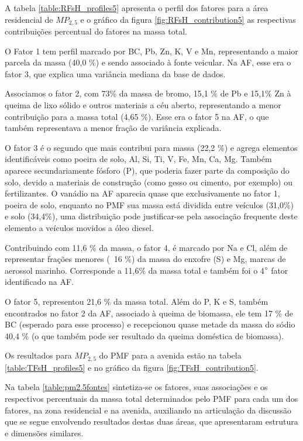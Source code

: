 A tabela \ref{table:RFsH_profiles5} apresenta o perfil dos fatores para a área
residencial de $MP_{2,5}$ e o gráfico da figura \ref{fig:RFsH_contribution5}
as respectivas contribuições percentual do fatores na massa total. 

O Fator 1 tem perfil marcado por BC, Pb, Zn, K, V e Mn, representando a maior 
parcela da massa (40,0 \%) e sendo associado à fonte veicular. 
Na AF, esse era o fator 3, que explica uma variância mediana da base de dados.

Associamos o fator 2, com 73\% da massa de bromo, 15,1 \% de Pb e 15,1\% Zn à 
queima de lixo sólido e outros materiais a céu aberto, representando a menor 
contribuição para a massa total (4,65 \%). Esse era o fator 5 na AF, o que 
também representava a menor fração de variância explicada.

O fator 3 é o segundo que mais contribui para massa (22,2 \%) e agrega elementos
identificáveis como poeira de solo, Al, Si, Ti, V, Fe, Mn, Ca, Mg. 
Também aparece secundariamente fósforo (P), que poderia fazer parte da 
composição do solo, devido a materiais de construção (como gesso ou cimento, 
por exemplo) ou fertilizantes. O vanádio na AF aparecia quase que exclusivamente
no fator 1, poeira de solo, enquanto no PMF sua massa está dividida entre 
veículos (31,0\%) e solo (34,4\%), uma distribuição pode justificar-se pela 
associação frequente deste elemento a veículos movidos a óleo diesel.

Contribuindo com 11,6 \% da massa, o fator 4, é marcado por Na e Cl, além de 
representar frações menores (~16 \%) da massa do enxofre (S) e Mg, 
marcas de aerossol marinho. Corresponde a 11,6\% da massa total e também foi o 
4$\degree$ fator identificado na AF.

O fator 5, representou  21,6 \% da massa total. Além do P, K e S, também 
encontrados no fator 2 da AF, associado à queima de biomassa, ele tem 
17 \% de BC (esperado para esse processo) e recepcionou quase metade da massa 
do sódio 40,4 \% (o que também pode ser resultado da queima doméstica de biomassa).

Os resultados para $MP_{2,5}$ do PMF para a avenida estão na tabela 
\ref{table:TFsH_profiles5} e no gráfico da figura \ref{fig:TFsH_contribution5}. 

Na tabela \ref{table:pm2.5fontes} sintetiza-se os fatores, suas associações e 
os respectivos percentuais da massa total determinados pelo PMF para cada um 
dos fatores, na zona residencial e na avenida, auxiliando na articulação da 
discussão que se segue envolvendo resultados destas duas áreas, 
que apresentaram estrutura e dimensões similares.

